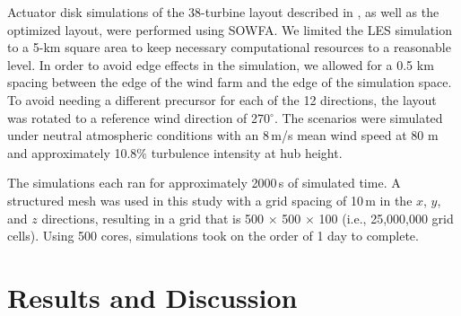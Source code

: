 \documentclass[conf]{new-aiaa}
\begin{document}
 Actuator disk simulations of the 38-turbine layout described in , as well as the  optimized layout, were performed using SOWFA. We limited the LES simulation to a 5-km square area to keep necessary computational resources to a reasonable level. In order to avoid edge effects in the simulation, we allowed for a 0.5 km spacing between the edge of the wind farm and the edge of the simulation space. To avoid needing a different precursor for each of the 12 directions, the layout was rotated to a reference wind direction of 270$^\circ$.  The scenarios were simulated under neutral atmospheric conditions with an 8\,m/s mean wind speed at 80 m and approximately 10.8$\%$ turbulence intensity at hub height.

The simulations each ran for approximately 2000\,s of simulated time.  A structured mesh was used in this study with a grid spacing of 10\,m in the $x$, $y$, and $z$ directions, resulting in a grid that is 500 $\times$ 500 $\times$ 100 (i.e., 25,000,000 grid cells).  Using 500 cores, simulations took on the order of 1 day to complete.  




\section{Results and Discussion}
\end{document}
